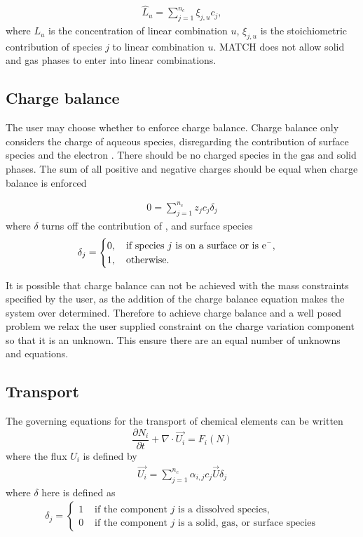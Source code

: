 \documentclass{article}
\newcommand{\fracpar}[2]{\frac{\partial #1}{\partial #2}}
\newcommand{\dive}{\nabla\cdot}
\begin{document}
\begin{align}
    \hat{L}_u = \sum_{j=1}^{n_c} \xi_{j,u} c_j, %
\end{align}
where $L_u$ is the concentration of linear combination $u$, $\xi_{j,u}$ is the stoichiometric contribution of species $j$ to linear combination $u$. MATCH does not allow solid and gas phases to enter into linear combinations.

\subsection{Charge balance}
The user may choose whether to enforce charge balance. Charge balance only considers the charge of aqueous species, disregarding the contribution of surface species and the electron . There should be no charged species in the gas and solid phases. The sum of all positive and negative charges should be equal when charge balance is enforced

\begin{align}
    0 = \sum_{j=1}^{n_c} z_j c_j \delta_j
\end{align}
where $\delta$ turns off the contribution of , and surface species
\begin{align}
\delta_j = \begin{cases}
0, \quad\text{if species $j$ is on a surface or is \ce{e-}},\\
1, \quad\text{otherwise}.
\end{cases}
\end{align}

It is possible that charge balance can not be achieved with the mass constraints specified by the user, as the addition of the charge balance equation makes the system over determined. Therefore to achieve charge balance and a well posed problem we relax the user supplied constraint on the charge variation component so that it is an unknown. This ensure there are an equal number of unknowns and equations.

\subsection{Transport}

The governing equations for the transport of chemical elements can be written
\begin{equation}
  \label{eq:transgen}
  \fracpar{N_i}{t} + \dive \vec{U_i} = F_i(N)
\end{equation}
where the flux $U_i$ is defined by
\begin{align}
    \vec{U_i} = \sum_{j=1}^{n_c} \alpha_{i,j} c_j \vec{U} \delta_j
\end{align}
where $\delta$ here is defined as
\begin{align}
  \delta_j =
  \begin{cases}
    1 &\text{ if the component $j$ is a dissolved species,}\\
    0 &\text{ if the component $j$ is a solid, gas, or surface species}
  \end{cases}
\end{align}
\end{document}
